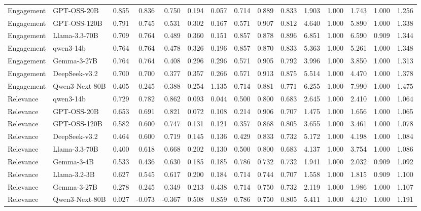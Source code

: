\begin{table}[t]
{\begin{tabular}{llrrrrrrrrrrrrr}
Engagement & GPT-OSS-20B & 0.855 & 0.836 & 0.750 & 0.194 & 0.057 & 0.714 & 0.889 & 0.833 & 1.903 & 1.000 & 1.743 & 1.000 & 1.256 \\
Engagement & GPT-OSS-120B & 0.791 & 0.745 & 0.531 & 0.302 & 0.167 & 0.571 & 0.907 & 0.812 & 4.640 & 1.000 & 5.890 & 1.000 & 1.338 \\
Engagement & Llama-3.3-70B & 0.709 & 0.764 & 0.489 & 0.360 & 0.151 & 0.857 & 0.878 & 0.896 & 6.851 & 1.000 & 6.590 & 0.909 & 1.344 \\
Engagement & qwen3-14b & 0.764 & 0.764 & 0.478 & 0.326 & 0.196 & 0.857 & 0.870 & 0.833 & 5.363 & 1.000 & 5.261 & 1.000 & 1.348 \\
Engagement & Gemma-3-27B & 0.764 & 0.764 & 0.408 & 0.296 & 0.296 & 0.571 & 0.905 & 0.792 & 3.996 & 1.000 & 3.850 & 1.000 & 1.313 \\
Engagement & DeepSeek-v3.2 & 0.700 & 0.700 & 0.377 & 0.357 & 0.266 & 0.571 & 0.913 & 0.875 & 5.514 & 1.000 & 4.470 & 1.000 & 1.378 \\
Engagement & Qwen3-Next-80B & 0.405 & 0.245 & -0.388 & 0.254 & 1.135 & 0.714 & 0.881 & 0.771 & 6.255 & 1.000 & 7.990 & 1.000 & 1.475 \\
Relevance & qwen3-14b & 0.729 & 0.782 & 0.862 & 0.093 & 0.044 & 0.500 & 0.800 & 0.683 & 2.645 & 1.000 & 2.410 & 1.000 & 1.064 \\
Relevance & GPT-OSS-20B & 0.653 & 0.691 & 0.821 & 0.072 & 0.108 & 0.214 & 0.906 & 0.707 & 1.475 & 1.000 & 1.656 & 1.000 & 1.065 \\
Relevance & GPT-OSS-120B & 0.582 & 0.600 & 0.747 & 0.131 & 0.121 & 0.357 & 0.868 & 0.805 & 3.655 & 1.000 & 3.461 & 1.000 & 1.078 \\
Relevance & DeepSeek-v3.2 & 0.464 & 0.600 & 0.719 & 0.145 & 0.136 & 0.429 & 0.833 & 0.732 & 5.172 & 1.000 & 4.198 & 1.000 & 1.084 \\
Relevance & Llama-3.3-70B & 0.400 & 0.618 & 0.668 & 0.202 & 0.130 & 0.500 & 0.800 & 0.683 & 4.137 & 1.000 & 3.754 & 1.000 & 1.086 \\
Relevance & Gemma-3-4B & 0.533 & 0.436 & 0.630 & 0.185 & 0.185 & 0.786 & 0.732 & 0.732 & 1.941 & 1.000 & 2.032 & 0.909 & 1.092 \\
Relevance & Llama-3.2-3B & 0.627 & 0.545 & 0.617 & 0.200 & 0.184 & 0.714 & 0.744 & 0.707 & 1.558 & 1.000 & 1.815 & 0.909 & 1.100 \\
Relevance & Gemma-3-27B & 0.278 & 0.245 & 0.349 & 0.213 & 0.438 & 0.714 & 0.750 & 0.732 & 2.119 & 1.000 & 1.986 & 1.000 & 1.107 \\
Relevance & Qwen3-Next-80B & 0.027 & -0.073 & -0.367 & 0.508 & 0.859 & 0.786 & 0.750 & 0.805 & 5.411 & 1.000 & 4.210 & 1.000 & 1.191 \\

\end{tabular}}
\end{table}
